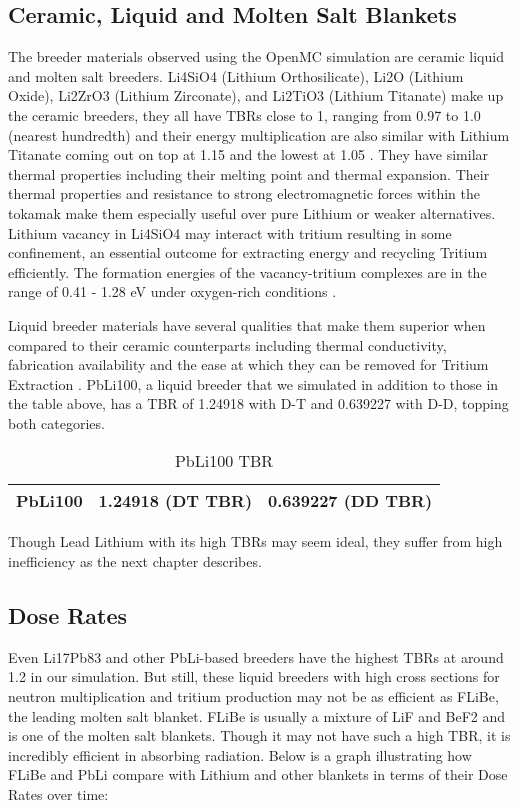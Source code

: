 \documentclass{article}
\begin{document}
\subsection{Ceramic, Liquid and Molten Salt Blankets}

The breeder materials observed using the OpenMC simulation are ceramic liquid and molten salt breeders. Li4SiO4 (Lithium Orthosilicate), Li2O (Lithium Oxide), Li2ZrO3 (Lithium Zirconate), and Li2TiO3 (Lithium Titanate) make up the ceramic breeders, they all have TBRs close to 1, ranging from 0.97 to 1.0 (nearest hundredth) and their energy multiplication are also similar with Lithium Titanate coming out on top at 1.15 and the lowest at 1.05 \cite{SAWAN20061131}. They have similar thermal properties including their melting point and thermal expansion. Their thermal properties and resistance to strong electromagnetic forces within the tokamak make them especially useful over pure Lithium or weaker alternatives. Lithium vacancy in Li4SiO4 may interact with tritium resulting in some confinement, an essential outcome for extracting energy and recycling Tritium efficiently. The formation energies of the vacancy-tritium complexes are in the range of 0.41 - 1.28 eV under oxygen-rich conditions \cite{slgxzygy15}. 

Liquid breeder materials have several qualities that make them superior when compared to their ceramic counterparts including thermal conductivity, fabrication availability and the ease at which they can be removed for Tritium Extraction \cite{tmrs88}. PbLi100, a liquid breeder that we simulated in addition to those in the table above, has a TBR of 1.24918 with D-T and 0.639227 with D-D, topping both categories.

\begin{table}[hbt!]
\centering
\caption{PbLi100 TBR}
\label{tab:table2}
\begin{tabular}{@{}lll@{}}
\toprule
PbLi100 & 1.24918 (DT TBR) & 0.639227 (DD TBR) \\ \bottomrule
\end{tabular}
\end{table}

Though Lead Lithium with its high TBRs may seem ideal, they suffer from high inefficiency as the next chapter describes.

\subsection{Dose Rates}

Even Li17Pb83 and other PbLi-based breeders have the highest TBRs at around 1.2 in our simulation. But still, these liquid breeders with high cross sections for neutron multiplication and tritium production may not be as efficient as FLiBe, the leading molten salt blanket. FLiBe is usually a mixture of LiF and BeF2 and is one of the molten salt blankets. Though it may not have such a high TBR, it is incredibly efficient in absorbing radiation. Below is a graph illustrating how FLiBe and PbLi compare with Lithium and other blankets in terms of their Dose Rates over time:
\end{document}
